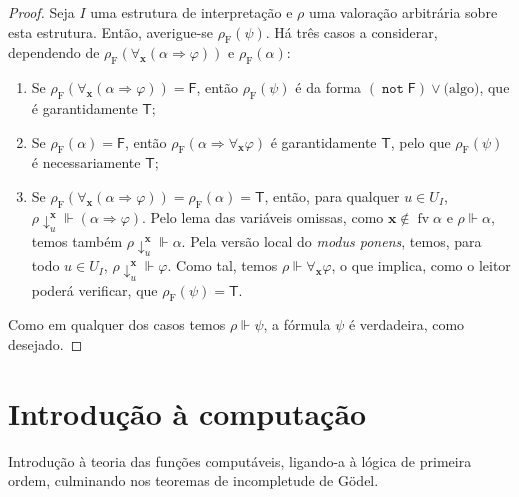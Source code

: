 \documentclass{report}
\theoremstyle{definition}
\theoremstyle{remark}
\renewcommand{\bf}[1]{\mathbf{#1}}
\newcommand{\F}{\mathrm{F}}
\newcommand{\lt}{\mathsf{T}}
\newcommand{\lf}{\mathsf{F}}
\DeclareMathOperator{\fv}{fv}
\DeclareMathOperator{\pnot}{\texttt{not}}
\newcommand{\imply}{\mathbin{\Rightarrow}}
\begin{document}
	\begin{proof}
	Seja $I$ uma estrutura de interpretação e $\rho$ uma valoração arbitrária sobre esta estrutura. Então, averigue-se $\rho_\F(\psi)$. Há três casos a considerar, dependendo de $\rho_\F(\forall_{\bf x}(\alpha \imply \varphi))$ e $\rho_\F(\alpha)$:
	
	\begin{enumerate}
	\item Se $\rho_\F(\forall_{\bf x}(\alpha \imply \varphi)) = \lf$, então $\rho_\F(\psi)$ é da forma $(\pnot \lf) \lor \text{(algo)}$, que é garantidamente $\lt$;
	
	\item Se $\rho_\F(\alpha) = \lf$, então $\rho_\F(\alpha \imply \forall_{\bf x} \varphi)$ é garantidamente $\lt$, pelo que $\rho_\F(\psi)$ é necessariamente $\lt$;
	
	\item Se $\rho_\F(\forall_{\bf x}(\alpha \imply \varphi)) = \rho_\F(\alpha) = \lt$, então, para qualquer $u \in U_I$, $\rho\!\downarrow^{\bf x}_u \Vdash (\alpha \imply \varphi)$. Pelo lema das variáveis omissas, como $\bf x \not \in \fv \alpha$ e $\rho \Vdash \alpha$, temos também $\rho\!\downarrow^{\bf x}_u \Vdash \alpha$. Pela versão local do \emph{modus ponens}, temos, para todo $u \in U_I$, $\rho\!\downarrow^{\bf x}_u \Vdash \varphi$. Como tal, temos $\rho \Vdash \forall_{\bf x} \varphi$, o que implica, como o leitor poderá verificar, que $\rho_\F(\psi) = \lt$.
	\end{enumerate}
	
	Como em qualquer dos casos temos $\rho \Vdash \psi$, a fórmula $\psi$ é verdadeira, como desejado.
	\end{proof}
	
	
	
	\chapter{Introdução à computação}
	
	Introdução à teoria das funções computáveis, ligando-a à lógica de primeira ordem, culminando nos teoremas de incompletude de Gödel.
	
	
	\nocite{fltc}
	\nocite{shoenfield}
	
	
	
\end{document}
